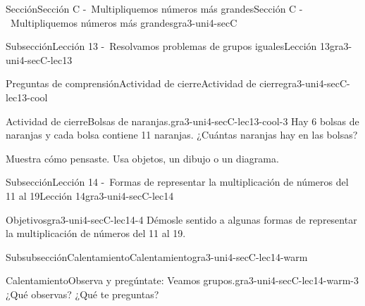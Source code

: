 \documentclass[twoside,10pt,]{article}
\begin{document}
\begin{sectionptx}{Sección}{Sección C -~Multipliquemos números más grandes}{}{Sección C -~Multipliquemos números más grandes}{}{}{gra3-uni4-secC}
\begin{subsectionptx}{Subsección}{Lección 13 -~Resolvamos problemas de grupos iguales}{}{Lección 13}{}{}{gra3-uni4-secC-lec13}
\typeout{************************************************}
%
\begin{reading-questions-subsubsection}{Preguntas de comprensión}{Actividad de cierre}{}{Actividad de cierre}{}{}{gra3-uni4-secC-lec13-cool}
\begin{project}{Actividad de cierre}{Bolsas de naranjas.}{gra3-uni4-secC-lec13-cool-3}%
Hay 6 bolsas de naranjas y cada bolsa contiene 11 naranjas. ¿Cuántas naranjas hay en las bolsas?%
\par
Muestra cómo pensaste. Usa objetos, un dibujo o un diagrama.%
\end{project}%
\end{reading-questions-subsubsection}
\end{subsectionptx}
%
%
\typeout{************************************************}
\typeout{************************************************}
%
\begin{subsectionptx}{Subsección}{Lección 14 -~Formas de representar la multiplicación de números del 11 al 19}{}{Lección 14}{}{}{gra3-uni4-secC-lec14}
\begin{objectives}{Objetivos}{gra3-uni4-secC-lec14-4}
Démosle sentido a algunas formas de representar la multiplicación de números del 11 al 19.%
\end{objectives}
%
%
\typeout{************************************************}
\typeout{************************************************}
%
\begin{subsubsectionptx}{Subsubsección}{Calentamiento}{}{Calentamiento}{}{}{gra3-uni4-secC-lec14-warm}
\begin{exploration}{Calentamiento}{Observa y pregúntate: Veamos grupos.}{gra3-uni4-secC-lec14-warm-3}%
¿Qué observas? ¿Qué te preguntas?%
\begin{sidebyside}{3}{0}{0}{0}%
\begin{sbspanel}{0.333333333333333}%

\end{sbspanel}
\end{sidebyside}
\end{exploration}
\end{subsubsectionptx}
\end{subsectionptx}
\end{sectionptx}
\end{document}
